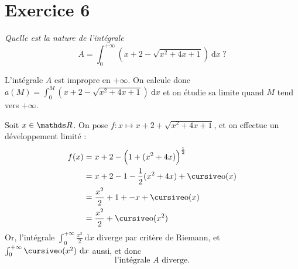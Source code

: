 \section{Exercice 6}\relax
{\slshape Quelle est la nature de l'intégrale \[
	A = \int_{0}^{+\infty} \left( x+2-\sqrt{x^2 + 4x + 1} \right)~\mathrm{d}x\ ?
\]}

L'intégrale $A$\/ est impropre en $+\infty$. On calcule donc $a(M) = \int_{0}^{M} \left( x + 2 - \sqrt{x^2 + 4x + 1} \right) ~\mathrm{d}x$\/ et on étudie sa limite quand $M$\/ tend vers $+\infty$.

Soit $x \in \R$. On pose $f : x \mapsto x + 2 + \sqrt{x^2 + 4x + 1}$, et on effectue un développement limité :
\begin{align*}
	f(x) &= x + 2 - \Big( 1 + (x^2 + 4x)\Big)^{\frac{1}{2}} \\
	&= x + 2 - 1 - \frac{1}{2}(x^2 + 4x) + \po(x) \\
	&= \frac{x^2}{2} + 1 + - x + \po(x)  \\
	&= \frac{x^2}{2} + \po(x^2) \\
\end{align*}
Or, l'intégrale $\int_{0}^{+\infty} \frac{x^2}{2}~\mathrm{d}x$\/ diverge par critère de {\sc Riemann}, et $\int_{0}^{+\infty} \po(x^2)~\mathrm{d}x$ aussi, et donc \[
	\boxed{\text{l'intégrale } A \text{ diverge}.}
\]

\begin{comment}
\section{Exercice 4}
\begin{enumerate}
	\item
		\begin{figure}[H]
			\centering
			\begin{asy}
				import graph;
				real f(real t) { return 1/t - floor(1/t);}
				bool3 fcheck(real t) { return t > 0 && f(t) < 10; }
				draw((0,0)--(10,0), Arrow(TeXHead));
				draw((0,0)--(0,10), Arrow(TeXHead));
				draw(graph(f, 0, 10, 500, fcheck), magenta);
				size(5cm);
			\end{asy}
			\caption{La fonction $\ds f(t) = \frac{1}{t} - \left\lfloor \frac{1}{t} \right\rfloor$}
		\end{figure}
		La fonction $t \mapsto \frac{1}{t}$\/ est continue par morceaux sur $]0,+\infty[$, et la fonction $u \mapsto \left\lfloor u \right\rfloor$\/ est continue par morceaux. Or, comme la composée et la différence de deux fonctions continues par morceaux est continue par morceaux, on en déduit que la fonction $f$\/ est continue par morceaux.
	\item
		L'intégrale $\int_{0}^{1} f(t)~\mathrm{d}t$.
\end{enumerate}
\end{comment}
